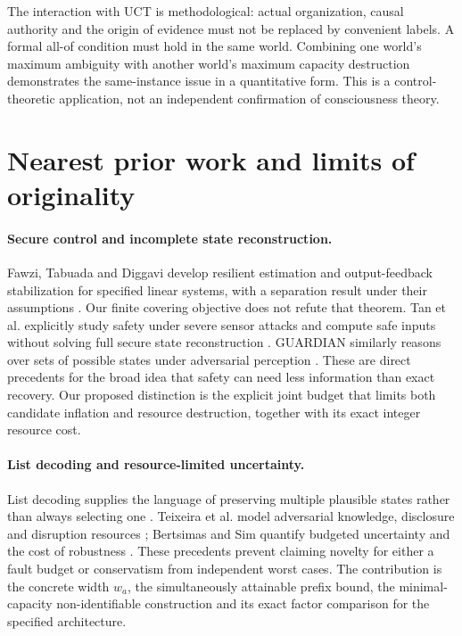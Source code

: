 \documentclass[11pt,a4paper]{article}
\theoremstyle{definition}\newtheorem{definition}{Definition}
\begin{document}
The interaction with UCT is methodological: actual organization, causal authority and the origin of evidence must not be replaced by convenient labels. A formal all-of condition must hold in the same world. Combining one world's maximum ambiguity with another world's maximum capacity destruction demonstrates the same-instance issue in a quantitative form. This is a control-theoretic application, not an independent confirmation of consciousness theory.

\section{Nearest prior work and limits of originality}
\paragraph{Secure control and incomplete state reconstruction.}
Fawzi, Tabuada and Diggavi develop resilient estimation and output-feedback stabilization for specified linear systems, with a separation result under their assumptions \cite{fawzi}. Our finite covering objective does not refute that theorem. Tan et al. explicitly study safety under severe sensor attacks and compute safe inputs without solving full secure state reconstruction \cite{tan24,tan25}. GUARDIAN similarly reasons over sets of possible states under adversarial perception \cite{guardian}. These are direct precedents for the broad idea that safety can need less information than exact recovery. Our proposed distinction is the explicit joint budget that limits both candidate inflation and resource destruction, together with its exact integer resource cost.

\paragraph{List decoding and resource-limited uncertainty.}
List decoding supplies the language of preserving multiple plausible states rather than always selecting one \cite{guruswami}. Teixeira et al. model adversarial knowledge, disclosure and disruption resources \cite{teixeira}; Bertsimas and Sim quantify budgeted uncertainty and the cost of robustness \cite{bertsimas}. These precedents prevent claiming novelty for either a fault budget or conservatism from independent worst cases. The contribution is the concrete width $w_a$, the simultaneously attainable prefix bound, the minimal-capacity non-identifiable construction and its exact factor comparison for the specified architecture.
\end{document}
